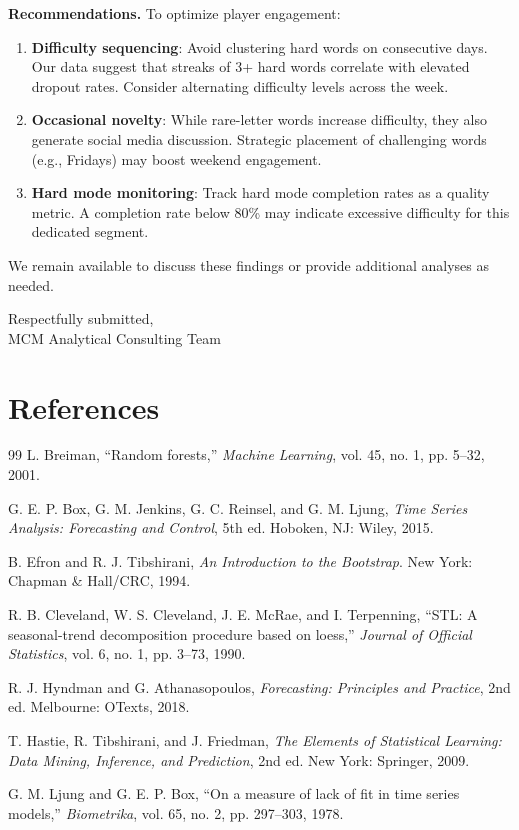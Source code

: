 \documentclass{mcmthesis}
\begin{document}
\begin{memo}[Memorandum]
\textbf{Recommendations.} To optimize player engagement:
\begin{enumerate}
\item \textbf{Difficulty sequencing}: Avoid clustering hard words on consecutive days. Our data suggest that streaks of 3+ hard words correlate with elevated dropout rates. Consider alternating difficulty levels across the week.
\item \textbf{Occasional novelty}: While rare-letter words increase difficulty, they also generate social media discussion. Strategic placement of challenging words (e.g., Fridays) may boost weekend engagement.
\item \textbf{Hard mode monitoring}: Track hard mode completion rates as a quality metric. A completion rate below 80\% may indicate excessive difficulty for this dedicated segment.
\end{enumerate}

We remain available to discuss these findings or provide additional analyses as needed.

Respectfully submitted,\\
MCM Analytical Consulting Team
\end{memo}

\section{References}

\begin{thebibliography}{99}
 L. Breiman, ``Random forests,'' \textit{Machine Learning}, vol. 45, no. 1, pp. 5--32, 2001.

 G. E. P. Box, G. M. Jenkins, G. C. Reinsel, and G. M. Ljung, \textit{Time Series Analysis: Forecasting and Control}, 5th ed. Hoboken, NJ: Wiley, 2015.

 B. Efron and R. J. Tibshirani, \textit{An Introduction to the Bootstrap}. New York: Chapman \& Hall/CRC, 1994.

 R. B. Cleveland, W. S. Cleveland, J. E. McRae, and I. Terpenning, ``STL: A seasonal-trend decomposition procedure based on loess,'' \textit{Journal of Official Statistics}, vol. 6, no. 1, pp. 3--73, 1990.

 R. J. Hyndman and G. Athanasopoulos, \textit{Forecasting: Principles and Practice}, 2nd ed. Melbourne: OTexts, 2018.

 T. Hastie, R. Tibshirani, and J. Friedman, \textit{The Elements of Statistical Learning: Data Mining, Inference, and Prediction}, 2nd ed. New York: Springer, 2009.

 G. M. Ljung and G. E. P. Box, ``On a measure of lack of fit in time series models,'' \textit{Biometrika}, vol. 65, no. 2, pp. 297--303, 1978.
\end{thebibliography}
\end{document}
